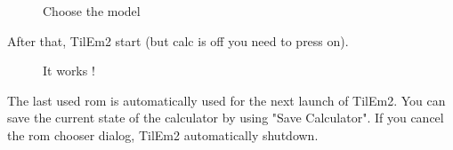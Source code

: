 \documentclass[10pt]{report}
\begin{document}
\begin{figure}[H]
\centering
{}
\caption{Choose the model}
\end{figure}

After that, TilEm2 start (but calc is off you need to press on).\newline
\begin{figure}[H]
\centering
{}
\caption{It works !}
\end{figure}
The last used rom is automatically used for the next launch of TilEm2.\newline
You can save the current state of the calculator by using "Save Calculator".\newline
If you cancel the rom chooser dialog, TilEm2 automatically shutdown.\newline
\end{document}

